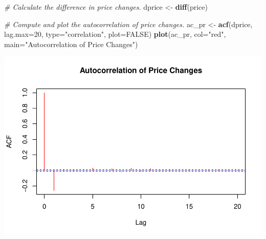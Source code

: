 \documentclass[
]{article}
\newenvironment{Shaded}{\begin{snugshade}}{\end{snugshade}}
\newcommand{\AttributeTok}[1]{\textcolor[rgb]{0.13,0.29,0.53}{#1}}
\newcommand{\CommentTok}[1]{\textcolor[rgb]{0.56,0.35,0.01}{\textit{#1}}}
\newcommand{\ConstantTok}[1]{\textcolor[rgb]{0.56,0.35,0.01}{#1}}
\newcommand{\DecValTok}[1]{\textcolor[rgb]{0.00,0.00,0.81}{#1}}
\newcommand{\FunctionTok}[1]{\textcolor[rgb]{0.13,0.29,0.53}{\textbf{#1}}}
\newcommand{\NormalTok}[1]{#1}
\newcommand{\OtherTok}[1]{\textcolor[rgb]{0.56,0.35,0.01}{#1}}
\newcommand{\SpecialCharTok}[1]{\textcolor[rgb]{0.81,0.36,0.00}{\textbf{#1}}}
\newcommand{\StringTok}[1]{\textcolor[rgb]{0.31,0.60,0.02}{#1}}
\begin{document}
\begin{Shaded}
\begin{Highlighting}[]
\CommentTok{\# Calculate the difference in price changes.}
\NormalTok{dprice }\OtherTok{\textless{}{-}} \FunctionTok{diff}\NormalTok{(price)}

\CommentTok{\# Compute and plot the autocorrelation of price changes.}
\NormalTok{ac\_pr }\OtherTok{\textless{}{-}} \FunctionTok{acf}\NormalTok{(dprice, }\AttributeTok{lag.max=}\DecValTok{20}\NormalTok{, }\AttributeTok{type=}\StringTok{"correlation"}\NormalTok{, }\AttributeTok{plot=}\ConstantTok{FALSE}\NormalTok{)}
\FunctionTok{plot}\NormalTok{(ac\_pr, }\AttributeTok{col=}\StringTok{"red"}\NormalTok{, }\AttributeTok{main=}\StringTok{"Autocorrelation of Price Changes"}\NormalTok{)}
\end{Highlighting}
\end{Shaded}

\includegraphics{FE570---MIdterm-Exam_files/figure-latex/unnamed-chunk-4-1.pdf}

\begin{Shaded}
\end{Shaded}
\end{document}
